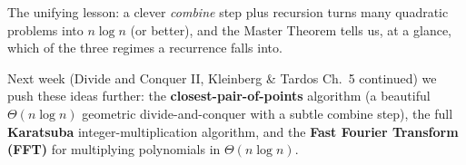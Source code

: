 \documentclass[11pt]{article}
\begin{document}
The unifying lesson: a clever \emph{combine} step plus recursion turns many quadratic
problems into $n \log n$ (or better), and the Master Theorem tells us, at a glance, which
of the three regimes a recurrence falls into.

Next week (Divide and Conquer II, Kleinberg \& Tardos Ch.\ 5 continued) we push these ideas
further: the \textbf{closest-pair-of-points} algorithm (a beautiful $\Theta(n \log n)$
geometric divide-and-conquer with a subtle combine step), the full \textbf{Karatsuba}
integer-multiplication algorithm, and the \textbf{Fast Fourier Transform (FFT)} for
multiplying polynomials in $\Theta(n \log n)$.
\end{document}
